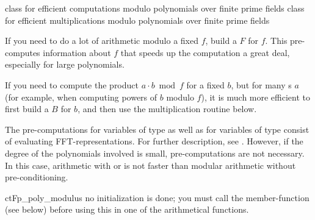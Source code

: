 


\NAME

 \dotfill class for efficient computations modulo
polynomials over finite prime fields
 \dotfill class for efficient multiplications modulo
polynomials over finite prime fields



\ABSTRACT

If you need to do a lot of arithmetic modulo a fixed  $f$, build a
 $F$ for $f$.  This pre-computes information about $f$ that speeds up the
computation a great deal, especially for large polynomials.

If you need to compute the product $a \cdot b \bmod f$ for a fixed  $b$,
but for many s $a$ (for example, when computing powers of $b$ modulo $f$),
it is much more efficient to first build a  $B$ for $b$, and then use
the multiplication routine below.



\DESCRIPTION

The pre-computations for variables of type  as well as for variables of
type  consist of evaluating FFT-representations.  For further
description, see \cite{Shoup:1995}.  However, if the degree of the polynomials involved is
small, pre-computations are not necessary.  In this case, arithmetic with 
or  is not faster than modular arithmetic without pre-conditioning.



\CONS

\begin{fcode}{ct}{Fp_poly_modulus}{}
  no initialization is done; you must call the member-function  (see below) before
  using this  in one of the arithmetical functions.
\end{fcode}

